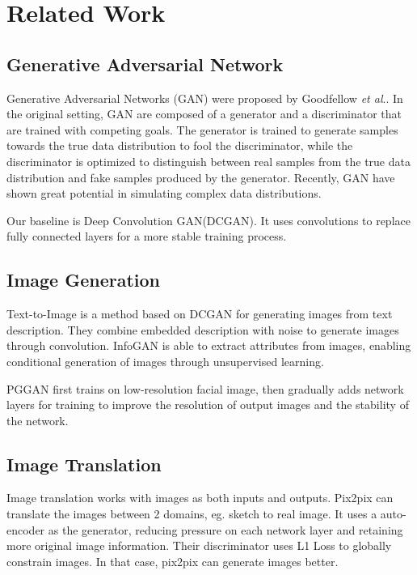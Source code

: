\section{Related Work}


\subsection{Generative Adversarial Network}

Generative Adversarial Networks (GAN) were proposed by Goodfellow \emph{et al}..
In the original setting, GAN are composed of a generator and a discriminator that are trained with competing goals.
The generator is trained to generate samples towards the true data distribution to fool the discriminator,
    while the discriminator is optimized to distinguish between real samples
    from the true data distribution and fake samples produced by the generator.
Recently, GAN have shown great potential in simulating complex data distributions.



Our baseline is Deep Convolution GAN(DCGAN).
It uses convolutions to replace fully connected layers for a more stable training process.




\subsection{Image Generation}

Text-to-Image is a method based on DCGAN for generating images from text description.
They combine embedded description with noise to generate images through convolution.
InfoGAN is able to extract attributes from images,
    enabling conditional generation of images through unsupervised learning.

PGGAN first trains on low-resolution facial image,
    then gradually adds network layers for training to improve the resolution of output images and the stability of the network.

\subsection{Image Translation}
Image translation works with images as both inputs and outputs.
Pix2pix can translate the images between 2 domains, eg. sketch to real image.
It uses a auto-encoder as the generator,
    reducing pressure on each network layer and retaining more original image information.
Their discriminator uses L1 Loss to globally constrain images.
In that case, pix2pix can generate images better.


